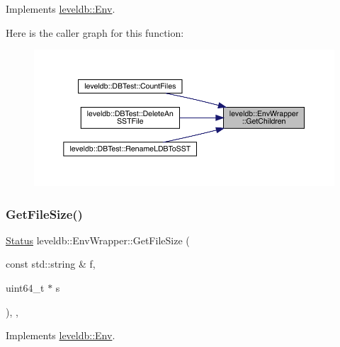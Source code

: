 Implements \mbox{\hyperlink{classleveldb_1_1_env_a53028e3112d7bb3bf6574ddaab18d6f6}{leveldb\+::\+Env}}.

Here is the caller graph for this function\+:
\nopagebreak
\begin{figure}[H]
\begin{center}
\leavevmode
\includegraphics[width=350pt]{classleveldb_1_1_env_wrapper_a5382cf15ad3a80c23f291238125d752d_icgraph}
\end{center}
\end{figure}
\mbox{\label{classleveldb_1_1_env_wrapper_a012b279556e2d53fb819b537722b3158}} 
\subsubsection{\texorpdfstring{GetFileSize()}{GetFileSize()}}
{\footnotesize\ttfamily \mbox{\hyperlink{classleveldb_1_1_status}{Status}} leveldb\+::\+Env\+Wrapper\+::\+Get\+File\+Size (\begin{DoxyParamCaption}\item[{const std\+::string \&}]{f,  }\item[{uint64\+\_\+t $\ast$}]{s }\end{DoxyParamCaption})\hspace{0.3cm}{\ttfamily [inline]}, {\ttfamily [override]}, {\ttfamily [virtual]}}



Implements \mbox{\hyperlink{classleveldb_1_1_env_aacb66541dcb3bd586e6cc5a87489690c}{leveldb\+::\+Env}}.

\mbox{\label{classleveldb_1_1_env_wrapper_aee69c4d48bec60d40126ef66ef451476}} 
